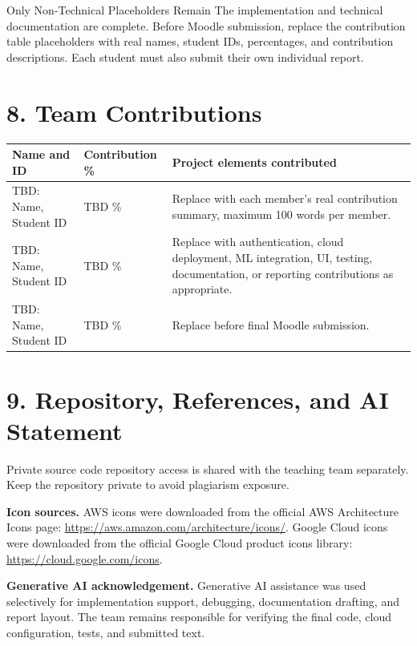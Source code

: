 \documentclass[12pt,a4paper]{article}
\begin{document}
\begin{summarybox}{Only Non-Technical Placeholders Remain}
The implementation and technical documentation are complete. Before Moodle submission, replace the contribution table placeholders with real names, student IDs, percentages, and contribution descriptions. Each student must also submit their own individual report.
\end{summarybox}

\section*{8. Team Contributions}
\begin{center}
\renewcommand{\arraystretch}{1.25}
\begin{tabularx}{\textwidth}{>{\raggedright\arraybackslash}p{34mm}>{\raggedleft\arraybackslash}p{26mm}X}
\toprule
\textbf{Name and ID} & \textbf{Contribution \%} & \textbf{Project elements contributed}\\
\midrule
\textcolor{GcpRed}{TBD: Name, Student ID} & \textcolor{GcpRed}{TBD \%} & Replace with each member's real contribution summary, maximum 100 words per member.\\
\textcolor{GcpRed}{TBD: Name, Student ID} & \textcolor{GcpRed}{TBD \%} & Replace with authentication, cloud deployment, ML integration, UI, testing, documentation, or reporting contributions as appropriate.\\
\textcolor{GcpRed}{TBD: Name, Student ID} & \textcolor{GcpRed}{TBD \%} & Replace before final Moodle submission.\\
\bottomrule
\end{tabularx}
\end{center}

\section*{9. Repository, References, and AI Statement}
Private source code repository access is shared with the teaching team separately. Keep the repository private to avoid plagiarism exposure.

\textbf{Icon sources.} AWS icons were downloaded from the official AWS Architecture Icons page:
\url{https://aws.amazon.com/architecture/icons/}. Google Cloud icons were downloaded from the official Google Cloud product icons library:
\url{https://cloud.google.com/icons}.

\textbf{Generative AI acknowledgement.} Generative AI assistance was used selectively for implementation support, debugging, documentation drafting, and report layout. The team remains responsible for verifying the final code, cloud configuration, tests, and submitted text.
\end{document}
